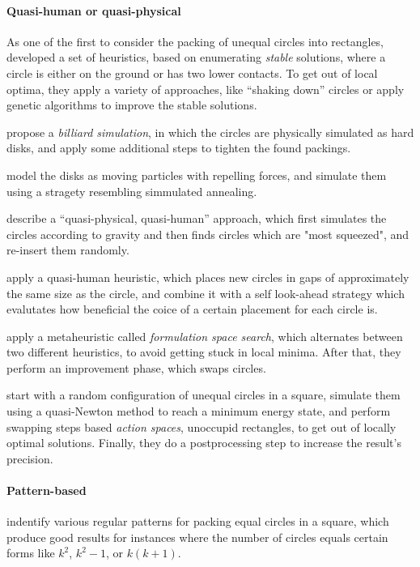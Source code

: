 \documentclass[a4paper,style=print,bibliography=totoc,nexus,lnum,extramargin]{tubsbook}
\begin{document}
\paragraph{Quasi-human or quasi-physical}

As one of the first to consider the packing of unequal circles into rectangles, \textcite{GGL1995packing} developed a set of heuristics, based on enumerating \emph{stable} solutions, where a circle is either on the ground or has two lower contacts. To get out of local optima, they apply a variety of approaches, like “shaking down” circles or apply genetic algorithms to improve the stable solutions.

\textcite{GLNO1998dense} propose a \emph{billiard simulation}, in which the circles are physically simulated as hard disks, and apply some additional steps to tighten the found packings.

\textcite{BDGL2000improving} model the disks as moving particles with repelling forces, and simulate them using a stragety resembling simmulated annealing.

\textcite{WHZX2002improved} describe a “quasi-physical, quasi-human” approach, which first simulates the circles according to gravity and then finds circles which are "most squeezed", and re-insert them randomly.

\textcite{HLLX2006new} apply a quasi-human heuristic, which places new circles in gaps of approximately the same size as the circle, and combine it with a self look-ahead strategy which evalutates how beneficial the coice of a certain placement for each circle is.

\textcite{LB2013packing} apply a metaheuristic called \emph{formulation space search}, which alternates between two different heuristics, to avoid getting stuck in local minima. After that, they perform an improvement phase, which swaps circles.

\textcite{HHY2015action} start with a random configuration of unequal circles in a square, simulate them using a quasi-Newton method to reach a minimum energy state, and perform swapping steps based \emph{action spaces}, unoccupid rectangles, to get out of locally optimal solutions. Finally, they do a postprocessing step to increase the result's precision.

\paragraph{Pattern-based}

\textcite{GL1996repeated} indentify various regular patterns for packing equal circles in a square, which produce good results for instances where the number of circles equals certain forms like $k^2$, $k^2-1$, or $k(k+1)$.
\end{document}
